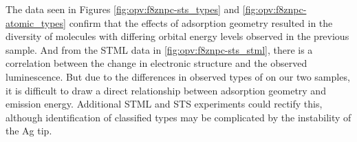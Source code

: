 





The data seen in Figures \ref{fig:opv:f8znpc-sts_types} and \ref{fig:opv:f8znpc-atomic_types} confirm that the effects of adsorption geometry resulted in the diversity of molecules with differing orbital energy levels observed in the previous sample. And from the \ac{STML} data in \autoref{fig:opv:f8znpc-sts_stml}, there is a correlation between the change in electronic structure and the observed luminescence. But due to the differences in observed types of  on our two samples, it is difficult to draw a direct relationship between adsorption geometry and emission energy. Additional \ac{STML} and \ac{STS} experiments could rectify this, although identification of classified types may be complicated by the instability of the Ag tip.



